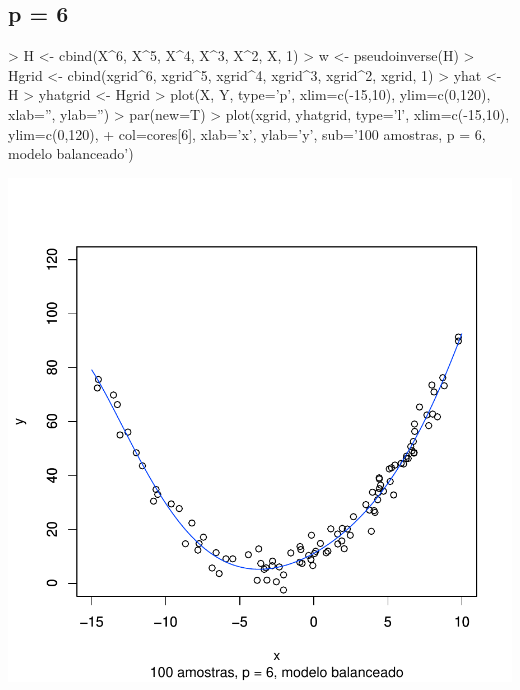 \documentclass{article}
\begin{document}
\subsection{p = 6}
\begin{Schunk}
\begin{Sinput}
> H <- cbind(X^6, X^5, X^4, X^3, X^2, X, 1)
> w <- pseudoinverse(H) %
> Hgrid <- cbind(xgrid^6, xgrid^5, xgrid^4, xgrid^3, xgrid^2, xgrid, 1)
> yhat <- H %
> yhatgrid <- Hgrid %
> plot(X, Y, type='p', xlim=c(-15,10), ylim=c(0,120), xlab='', ylab='')
> par(new=T)
> plot(xgrid, yhatgrid, type='l', xlim=c(-15,10), ylim=c(0,120),
+      col=cores[6], xlab='x', ylab='y', sub='100 amostras, p = 6, modelo balanceado')
\end{Sinput}
\end{Schunk}
\includegraphics{aprox-016}
\end{document}
